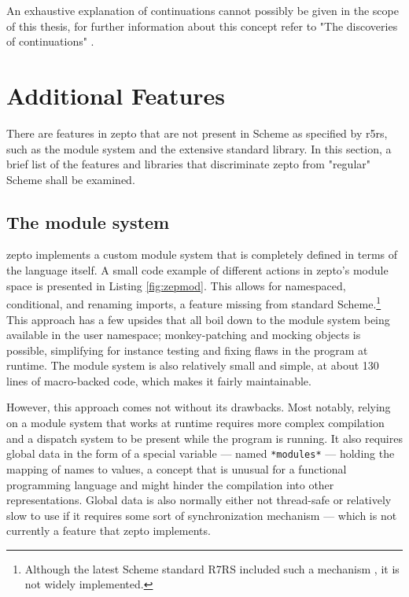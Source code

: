 \documentclass[oneside,11pt,xetex]{scrbook}
\begin{document}
An exhaustive explanation of continuations cannot possibly be given in the scope
of this thesis, for further information about this concept refer to "The discoveries
of continuations" \parencite{CONT}.

\section{Additional Features}

There are features in zepto that are not present in Scheme as specified by \gls{r5rs}, such
as the module system and the extensive standard library. In this section, a brief list of
the features and libraries that discriminate zepto from "regular" Scheme shall be examined.

\subsection{The module system}

zepto implements a custom module system that is completely defined in terms of the language
itself. A small code example of different actions in zepto's module space is presented in
Listing \ref{fig:zepmod}.
This allows for namespaced, conditional, and renaming imports, a feature missing from standard
Scheme.\footnote{Although the latest Scheme standard R7RS included such a mechanism \parencite{R7RS},
it is not widely implemented.}
This approach has a few upsides that all boil down to the module system being available in the
user namespace; monkey-patching and mocking objects is possible, simplifying for instance
testing and fixing flaws in the program at runtime. The module system is also relatively small
and simple, at about 130 lines of macro-backed code, which makes it fairly maintainable.

However, this approach comes not without its drawbacks. Most notably, relying on a module
system that works at runtime requires more complex compilation and a dispatch system to
be present while the program is running. It also requires global data in the form of a
special variable --- named \texttt{*modules*} --- holding the mapping of names to values,
a concept that is unusual for a functional programming language and might hinder the
compilation into other representations. Global data is also normally either not thread-safe
or relatively slow to use if it requires some sort of synchronization mechanism --- which is
not currently a feature that zepto implements.
\end{document}

